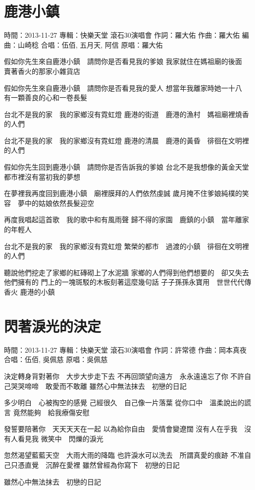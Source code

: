 \documentclass[UTF8,a4paper,oneside,twocolumn,12pt]{ctexbook}
\newcommand{\infopair}[2]{\textbullet #1：#2}
\newcommand{\zc}[1][伍佰]{\infopair{作詞}{#1}}
\newcommand{\zq}[1][伍佰]{\infopair{作曲}{#1}}
\newcommand{\bq}[1][伍佰]{\infopair{編曲}{#1}}
\newcommand{\zj}[1]{\infopair{專輯}{#1}}
\newcommand{\yc}[1]{\infopair{原唱}{#1}}
\newcommand{\sj}[1]{\infopair{時間}{#1}}
\newenvironment{info}{\begin{flushleft}\kaishu
	}
	{\end{flushleft}\normalsize\yahei\par}
\newenvironment{lyric}{
	}
{}
\begin{document}
\section{鹿港小鎮}
\begin{info}
	\sj{2013-11-27}
	\zj{快樂天堂 滾石30演唱會}
	\zc[羅大佑]
	\zq[羅大佑]
	\bq[山崎稔]
	\infopair{合唱}{伍佰, 五月天, 阿信}
	\yc{羅大佑}
\end{info}
\begin{lyric}
	假如你先生來自鹿港小鎮　請問你是否看見我的爹娘
	我家就住在媽祖廟的後面　賣著香火的那家小雜貨店

	假如你先生來自鹿港小鎮　請問你是否看見我的愛人
	想當年我離家時她一十八　有一顆善良的心和一卷長髮

	台北不是我的家　我的家鄉沒有霓虹燈
	鹿港的街道　鹿港的漁村　媽祖廟裡燒香的人們

	台北不是我的家　我的家鄉沒有霓虹燈
	鹿港的清晨　鹿港的黃昏　徘徊在文明裡的人們

	假如你先生回到鹿港小鎮　請問你是否告訴我的爹娘
	台北不是我想像的黃金天堂　都市裡沒有當初我的夢想

	在夢裡我再度回到鹿港小鎮　廟裡膜拜的人們依然虔誠
	歲月掩不住爹娘純樸的笑容　夢中的姑娘依然長髮迎空

	再度我唱起這首歌　我的歌中和有風雨聲
	歸不得的家園　鹿鎮的小鎮　當年離家的年輕人

	台北不是我的家　我的家鄉沒有霓虹燈
	繁榮的都市　過渡的小鎮　徘徊在文明裡的人們

	聽說他們挖走了家鄉的紅磚砌上了水泥牆
	家鄉的人們得到他們想要的　卻又失去他們擁有的
	門上的一塊斑駁的木板刻著這麼幾句話
	子子孫孫永寶用　世世代代傳香火
	鹿港的小鎮
\end{lyric}

\section{閃著淚光的決定}
\begin{info}
	\sj{2013-11-27}
	\zj{快樂天堂 滾石30演唱會}
	\zc[許常德]
	\zq[岡本真夜]
	\infopair{合唱}{伍佰, 吳佩慈}
	\yc{吳佩慈}
\end{info}
\begin{lyric}
	決定轉身背對著你　大步大步走下去
	不再回頭望向遠方　永永遠遠忘了你
	不許自己哭哭啼啼　敢愛而不敢離
	雖然心中無法抹去　初戀的日記

	多少明白　心被掏空的感覺
	己經很久　自己像一片落葉
	從你口中　溫柔說出的謊言
	竟然能夠　給我療傷安慰

	發誓要陪著你　天天天天在一起
	以為給你自由　愛情會變遼闊
	沒有人在乎我　沒有人看見我
	微笑中　閃爍的淚光

	忽然渴望藍藍天空　大雨大雨的降臨
	也許淚水可以洗去　所謂真愛的痕跡
	不准自己只憑直覺　沉醉在愛裡
	雖然曾經為你寫下　初戀的日記

	雖然心中無法抹去　初戀的日記
\end{lyric}
\end{document}

